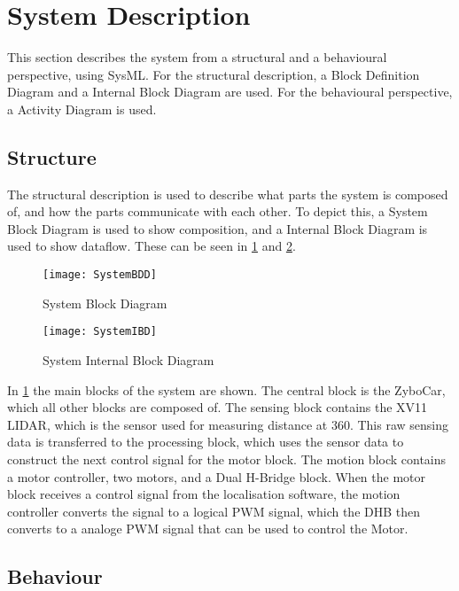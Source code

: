 \documentclass[Main]{subfiles}
\begin{document}
\section{System Description} %
\label{sec:system_description}

	This section describes the system from a structural and a behavioural perspective, using SysML.
	For the structural description, a Block Definition Diagram and a Internal Block Diagram are used. For the behavioural perspective, a Activity Diagram is used.
	
	\subsection{Structure} %
	\label{sub:system_structure}

		The structural description is used to describe what parts the system is composed of, and how the parts communicate with each other.
		To depict this, a System Block Diagram is used to show composition, and a Internal Block Diagram is used to show dataflow. 
		These can be seen in \ref{fig:systembdd} and \ref{fig:systemibd}.
		
		\begin{figure}[H]
			\centering
			\texttt{[image: SystemBDD]}
			\caption{System Block Diagram}
			\label{fig:systembdd}
		\end{figure}
		
		\begin{figure}[H]
			\centering
			\texttt{[image: SystemIBD]}
			\caption{System Internal Block Diagram}
			\label{fig:systemibd}
		\end{figure}
		
		In \ref{fig:systembdd} the main blocks of the system are shown. 
		The central block is the ZyboCar, which all other blocks are composed of.
		The sensing block contains the XV11 LIDAR, which is the sensor used for measuring distance at 360\degree.
		This raw sensing data is transferred to the processing block, which uses the sensor data to construct the next control signal for the motor block.
		The motion block contains a motor controller, two motors, and a Dual H-Bridge block.
		When the motor block receives a control signal from the localisation software, the motion controller converts the signal to a logical PWM signal, which the DHB then converts to a analoge PWM signal that can be used to control the Motor.
		
	\subsection{Behaviour} %
	\label{sub:system_behaviour}
		
\end{document}
